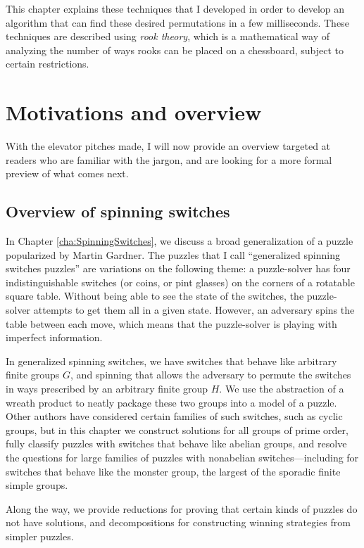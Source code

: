 This chapter explains these techniques that I developed in order to develop
an algorithm that can find these desired permutations in a few milliseconds.
These techniques are
described using \textit{rook theory}, which is a mathematical way of analyzing
the number of ways rooks can be placed on a chessboard, subject to certain
restrictions.

\section{Motivations and overview}
With the elevator pitches made, I will now provide an overview targeted at
readers who are familiar with the jargon, and are looking for a more formal
preview of what comes next.

\subsection{Overview of spinning switches}
In Chapter \ref{cha:SpinningSwitches}, we discuss a broad generalization of a
puzzle popularized by Martin Gardner. The puzzles that I call
``generalized spinning switches puzzles'' are variations on the following theme:
a puzzle-solver has four indistinguishable switches (or coins, or pint glasses)
on the corners of a rotatable square table. Without being able to see the state
of the switches, the puzzle-solver attempts to get them all in a given state.
However, an adversary spins the table between each move, which means that the
puzzle-solver is playing with imperfect information.

In generalized spinning switches, we have switches that behave like arbitrary
finite groups $G$, and spinning that allows the adversary to permute the switches in
ways prescribed by an arbitrary finite group $H$. We use the abstraction of a wreath
product to neatly package these two groups into a model of a puzzle.
Other authors have considered certain families of such switches, such as cyclic
groups, but in this chapter we construct solutions for all groups of prime order,
fully classify puzzles with switches that behave like abelian groups,
and resolve the questions for large families of puzzles with nonabelian
switches---including for switches that behave like the monster group, the
largest of the sporadic finite simple groups.

Along the way, we provide reductions for proving that certain kinds of puzzles
do not have solutions, and decompositions for constructing winning strategies
from simpler puzzles.

